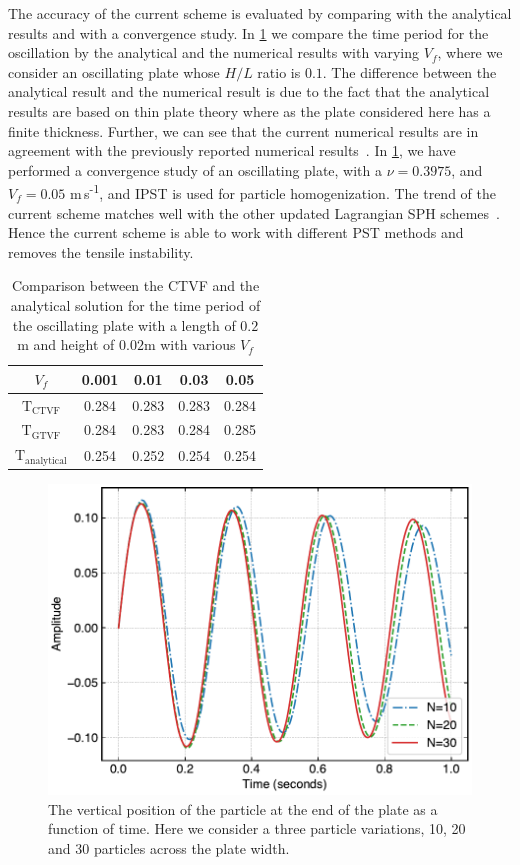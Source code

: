 The accuracy of the current scheme is evaluated by comparing with the
analytical results and with a convergence study. In
\cref{table:compare-analytical-with-simulated-h-l-0-1} we compare the time
period for the oscillation by the analytical and the numerical results with
varying $V_f$, where we consider an oscillating plate whose $H/L$ ratio is
$0.1$. The difference between the analytical result and the numerical result
is due to the fact that the analytical results are based on thin plate theory
where as the plate considered here has a finite thickness. Further, we can see
that the current numerical results are in agreement with the previously
reported numerical results~\citep{gray-ed-2001, zhang_hu_adams17}. In
\cref{fig:oscillating:ipst_convergence_plot}, we have performed a convergence
study of an oscillating plate, with a $\nu=0.3975$, and $V_f=0.05$
m\,s\textsuperscript{-1}, and IPST is used for particle homogenization. The trend of
the current scheme matches well with the other updated Lagrangian SPH
schemes~\citep{gray-ed-2001, zhang_hu_adams17}. Hence the current scheme is
able to work with different PST methods and removes the tensile instability.

\begin{table}[!htpb]
\centering
\begin{tabular}{c c c c c}
  \hline
  $V_f$ & 0.001 & 0.01 & 0.03 & 0.05 \\
  \hline
  $\text{T}_{\mathrm{CTVF}}$ & 0.284 & 0.283 & 0.283 & 0.284 \\
  $\text{T}_{\mathrm{GTVF}}$ & 0.284 & 0.283 & 0.284 & 0.285 \\
  $\text{T}_{\mathrm{analytical}}$ & 0.254 & 0.252 & 0.254 & 0.254
\end{tabular}
\caption{Comparison between the CTVF and the analytical solution for the time
  period of the oscillating plate with a length of $0.2$m and height of
  $0.02$m with various $V_f$}
\label{table:compare-analytical-with-simulated-h-l-0-1}
\end{table}
\begin{figure}
  \centering
  \includegraphics[width=0.7\columnwidth]{figures/ctvf/figures/oscillating_plate/ipst_convergence_plot}
  \caption{The vertical position of the particle at the end of the plate as a
    function of time. Here we consider a three particle variations, 10, 20 and
    30 particles across the plate width.}
\label{fig:oscillating:ipst_convergence_plot}
\end{figure}
%

